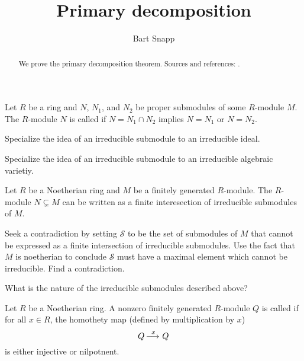 \documentclass{ximera}
\author{Bart Snapp}
\title{Primary decomposition}
\begin{document}
\begin{abstract}
  We prove the primary decomposition theorem. Sources and references:
  \cite{AM1969, sD2008, dE1995, mR1995}.
\end{abstract}
\maketitle


\begin{definition}
  Let $R$ be a ring and $N$, $N_1$, and $N_2$ be proper submodules of
  some $R$-module $M$. The $R$-module $N$ is called 
  if $N = N_1\cap N_2$ implies $N=N_1$ or $N=N_2$.
\end{definition}


\begin{exercise}
  Specialize the idea of an irreducible submodule to an irreducible
  ideal.
\end{exercise}

\begin{exercise}
  Specialize the idea of an irreducible submodule to an irreducible
  algebraic varietiy.
\end{exercise}


\begin{lemma}\label{L:irrdecomp}
  Let $R$ be a Noetherian ring and $M$ be a finitely generated
  $R$-module. The $R$-module $N\subsetneq M$ can be written as a finite
  interesection of irreducible submodules of $M$.
  \begin{sketch}
    Seek a contradiction by setting $\mathcal{S}$ to be the set of
    submodules of $M$ that cannot be expressed as a finite
    intersection of irreducible submodules. Use the fact that $M$ is
    noetherian to conclude $\mathcal{S}$ must have a maximal element
    which cannot be irreducible. Find a contradiction.
  \end{sketch}
\end{lemma}

\begin{question}
What is the nature of the irreducible submodules described above?
\end{question}


\begin{definition}
  Let $R$ be a Noetherian ring. A nonzero finitely generated
  $R$-module $Q$ is called  if for all $x\in R$, the
  homothety map (defined by multiplication by $x$)
  \[
  Q\mathop{\longrightarrow\,}\limits^x Q
  \]
  is either injective or nilpotnent.
\end{definition}
\end{document}
